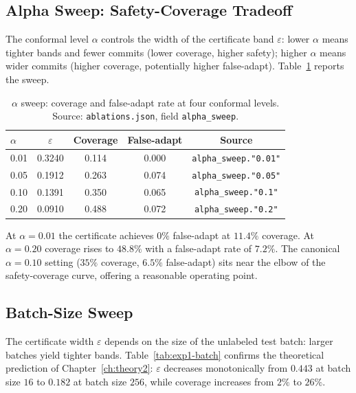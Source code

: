 \subsection{Alpha Sweep: Safety-Coverage Tradeoff}

The conformal level $\alpha$ controls the width of the certificate band $\varepsilon$:
lower $\alpha$ means tighter bands and fewer commits (lower coverage, higher safety);
higher $\alpha$ means wider commits (higher coverage, potentially higher false-adapt).
Table~\ref{tab:exp1-alpha} reports the sweep.

\begin{table}[ht]
\centering
\caption{$\alpha$ sweep: coverage and false-adapt rate at four conformal levels.
  Source: \texttt{ablations.json}, field \texttt{alpha\_sweep}.}
\label{tab:exp1-alpha}
\begin{tabular}{lcccc}
\toprule
$\alpha$ & $\varepsilon$ & Coverage & False-adapt & Source \\
\midrule
0.01 & 0.3240 & 0.114 & 0.000 & \texttt{alpha\_sweep."0.01"} \\
0.05 & 0.1912 & 0.263 & 0.074 & \texttt{alpha\_sweep."0.05"} \\
0.10 & 0.1391 & 0.350 & 0.065 & \texttt{alpha\_sweep."0.1"} \\
0.20 & 0.0910 & 0.488 & 0.072 & \texttt{alpha\_sweep."0.2"} \\
\bottomrule
\end{tabular}
\end{table}

At $\alpha = 0.01$ the certificate achieves $0\%$ false-adapt at $11.4\%$ coverage.
At $\alpha = 0.20$ coverage rises to $48.8\%$ with a false-adapt rate of $7.2\%$.  The
canonical $\alpha = 0.10$ setting ($35\%$ coverage, $6.5\%$ false-adapt) sits near the
elbow of the safety-coverage curve, offering a reasonable operating point.

\subsection{Batch-Size Sweep}

The certificate width $\varepsilon$ depends on the size of the unlabeled test batch:
larger batches yield tighter bands.  Table~\ref{tab:exp1-batch} confirms the theoretical
prediction of Chapter~\ref{ch:theory2}: $\varepsilon$ decreases monotonically from
$0.443$ at batch size $16$ to $0.182$ at batch size $256$, while coverage increases from
$2\%$ to $26\%$.

